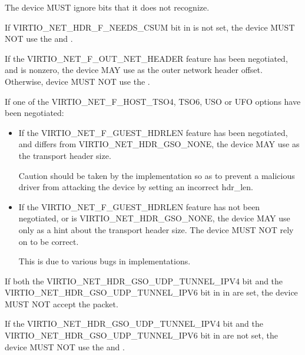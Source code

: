 The device MUST ignore  bits that it does not recognize.

If VIRTIO_NET_HDR_F_NEEDS_CSUM bit in  is not set, the
device MUST NOT use the  and .

If the VIRTIO_NET_F_OUT_NET_HEADER feature has been negotiated,
and  is nonzero, the device MAY use 
as the outer network header offset. Otherwise, device MUST NOT use
the .

If one of the VIRTIO_NET_F_HOST_TSO4, TSO6, USO or UFO options have
been negotiated:
\begin{itemize}
\item If the VIRTIO_NET_F_GUEST_HDRLEN feature has been negotiated,
	and  differs from VIRTIO_NET_HDR_GSO_NONE,
	the device MAY use  as the transport header size.

	\begin{note}
	Caution should be taken by the implementation so as to prevent
	a malicious driver from attacking the device by setting an incorrect hdr_len.
	\end{note}

\item If the VIRTIO_NET_F_GUEST_HDRLEN feature has not been negotiated,
	or  is VIRTIO_NET_HDR_GSO_NONE,
	the device MAY use  only as a hint about the
	transport header size.
	The device MUST NOT rely on  to be correct.

	\begin{note}
	This is due to various bugs in implementations.
	\end{note}
\end{itemize}

If both the VIRTIO_NET_HDR_GSO_UDP_TUNNEL_IPV4 bit and
the VIRTIO_NET_HDR_GSO_UDP_TUNNEL_IPV6 bit in in  are set,
the device MUST NOT accept the packet.

If the VIRTIO_NET_HDR_GSO_UDP_TUNNEL_IPV4 bit and the VIRTIO_NET_HDR_GSO_UDP_TUNNEL_IPV6
bit in  are not set, the device MUST NOT use the
 and .

